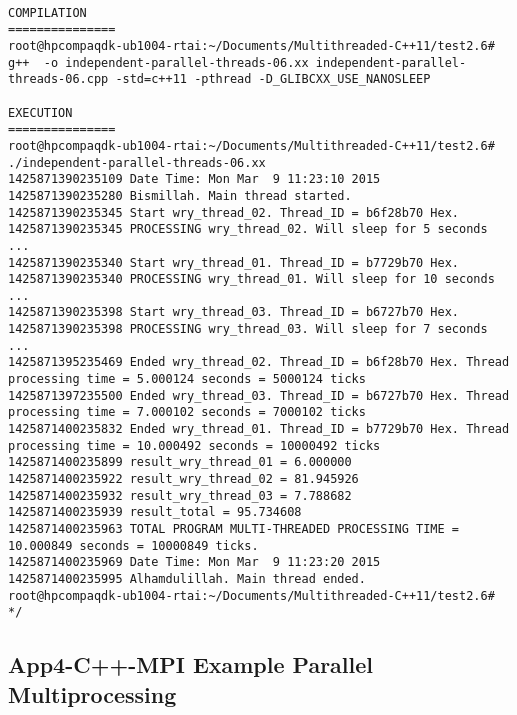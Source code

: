 \begin{lstlisting}[caption={App4-C++2011 Execution Parallel Multithreading}, label=App4-C++2011 Execution Parallel Multithreading]

COMPILATION
===============
root@hpcompaqdk-ub1004-rtai:~/Documents/Multithreaded-C++11/test2.6# g++  -o independent-parallel-threads-06.xx independent-parallel-threads-06.cpp -std=c++11 -pthread -D_GLIBCXX_USE_NANOSLEEP 

EXECUTION
===============
root@hpcompaqdk-ub1004-rtai:~/Documents/Multithreaded-C++11/test2.6# ./independent-parallel-threads-06.xx 
1425871390235109 Date Time: Mon Mar  9 11:23:10 2015
1425871390235280 Bismillah. Main thread started. 
1425871390235345 Start wry_thread_02. Thread_ID = b6f28b70 Hex. 
1425871390235345 PROCESSING wry_thread_02. Will sleep for 5 seconds ... 
1425871390235340 Start wry_thread_01. Thread_ID = b7729b70 Hex. 
1425871390235340 PROCESSING wry_thread_01. Will sleep for 10 seconds ... 
1425871390235398 Start wry_thread_03. Thread_ID = b6727b70 Hex. 
1425871390235398 PROCESSING wry_thread_03. Will sleep for 7 seconds ... 
1425871395235469 Ended wry_thread_02. Thread_ID = b6f28b70 Hex. Thread processing time = 5.000124 seconds = 5000124 ticks 
1425871397235500 Ended wry_thread_03. Thread_ID = b6727b70 Hex. Thread processing time = 7.000102 seconds = 7000102 ticks 
1425871400235832 Ended wry_thread_01. Thread_ID = b7729b70 Hex. Thread processing time = 10.000492 seconds = 10000492 ticks 
1425871400235899 result_wry_thread_01 = 6.000000 
1425871400235922 result_wry_thread_02 = 81.945926 
1425871400235932 result_wry_thread_03 = 7.788682 
1425871400235939 result_total = 95.734608 
1425871400235963 TOTAL PROGRAM MULTI-THREADED PROCESSING TIME = 10.000849 seconds = 10000849 ticks. 
1425871400235969 Date Time: Mon Mar  9 11:23:20 2015
1425871400235995 Alhamdulillah. Main thread ended. 
root@hpcompaqdk-ub1004-rtai:~/Documents/Multithreaded-C++11/test2.6# 
*/
\end{lstlisting}

\pagebreak
\subsection{App4-C++-MPI Example Parallel Multiprocessing}

